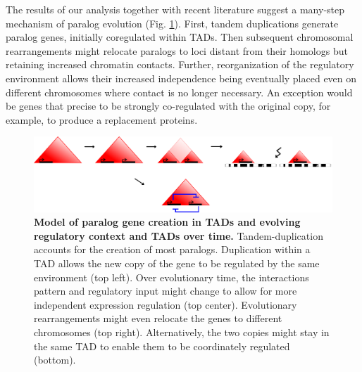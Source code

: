 \documentclass[a4paper,twoside=true,openright,parskip=full,chapterprefix=true,11pt,headings=normal,bibliography=totoc,listof=totoc,titlepage=on,captions=tableabove,draft=false]{scrreprt}
\theoremstyle{definition}
\theoremstyle{definition}
\theoremstyle{definition}
\theoremstyle{remark}
\begin{document}
The results of our analysis together with recent literature suggest a
many-step mechanism of paralog evolution (Fig.
\ref{fig:ParalogSeparation}). First, tandem duplications generate
paralog genes, initially coregulated within TADs. Then subsequent
chromosomal rearrangements might relocate paralogs to loci distant from
their homologs but retaining increased chromatin contacts. Further,
reorganization of the regulatory environment allows their increased
independence being eventually placed even on different chromosomes where
contact is no longer necessary. An exception would be genes that precise
to be strongly co-regulated with the original copy, for example, to
produce a replacement proteins.

\begin{figure}

{\centering \includegraphics[width=0.8\linewidth]{figures/model_paralog_expansion} 

}

\caption{\textbf{Model of paralog gene creation in TADs
and evolving regulatory context and TADs over time.} Tandem-duplication
accounts for the creation of most paralogs. Duplication within a TAD
allows the new copy of the gene to be regulated by the same environment
(top left). Over evolutionary time, the interactions pattern and
regulatory input might change to allow for more independent expression
regulation (top center). Evolutionary rearrangements might even relocate
the genes to different chromosomes (top right). Alternatively, the two
copies might stay in the same TAD to enable them to be coordinately
regulated (bottom).}\label{fig:ParalogSeparation}
\end{figure}
\end{document}
